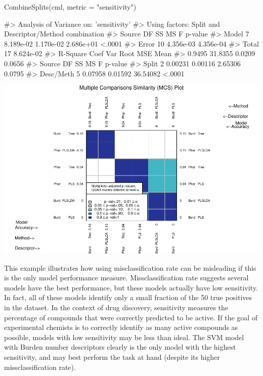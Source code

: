 \begin{Schunk}
\begin{Sinput}
CombineSplits(cml, metric = "sensitivity")
\end{Sinput}
\begin{Soutput}
#>    Analysis of Variance on: 'sensitivity'
#>  Using factors: Split and Descriptor/Method combination
#> Source    DF          SS          MS           F   p-value   
#> Model      7   8.189e-02   1.170e-02   2.686e+01    <.0001   
#> Error     10   4.356e-03   4.356e-04   
#> Total     17   8.624e-02   
#>       R-Square   Coef Var   Root MSE       Mean   
#>         0.9495    31.8355     0.0209     0.0656   
#> Source       DF         SS         MS          F   p-value   
#> Split         2    0.00231    0.00116    2.65306    0.0795   
#> Desc/Meth     5    0.07958    0.01592   36.54082    <.0001
\end{Soutput}

\includegraphics{chemmodlabRJournal_files/figure-latex/CombineSplits_se-1} \end{Schunk}

This example illustrates how using misclassification rate can be
misleading if this is the only model performance measure.
Missclassification rate suggests several models have the best
performance, but these models actually have low sensitivity. In fact,
all of these models identify only a small fraction of the 50 true
positives in the dataset. In the context of drug discovery, sensitivity
measures the percentage of compounds that were correctly predicted to be
active. If the goal of experimental chemists is to correctly identify as
many active compounds as possible, models with low sensitivity may be
less than ideal. The SVM model with Burden number descriptors clearly is
the only model with the highest sensitivity, and may best perform the
task at hand (despite its higher missclassification rate).

